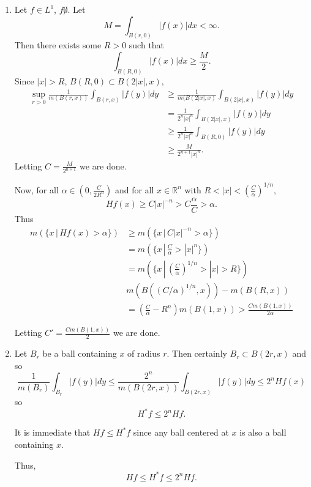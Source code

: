 \documentclass[12pt]{Homework}
\begin{document}
\begin{solution}$\,$
\begin{enumerate}[label=(\alph*)]
    \item Let $f\in L^1$, $f\not0$. Let $$M=\int_{B(r,0)}|f(x)|dx<\infty.$$ Then there exists some $R>0$ such that $$\int_{B(R,0)}|f(x)|dx\ge\frac{M}{2}.$$ Since $|x|>R$, $B(R,0)\subset B(2|x|,x),$ \begin{align*}
        \sup_{r>0}\frac{1}{m(B(r,x))}\int_{B(r,x)}|f(y)|dy&\ge\frac{1}{m(B(2|x|,x)}\int_{B(2|x|,x)}|f(y)|dy\\
        &=\frac{1}{2^n|x|^n}\int_{B(2|x|,x)}|f(y)|dy\\
        &\ge\frac{1}{2^n|x|^n}\int_{B(R,0)}|f(y)|dy\\
        &\ge\frac{M}{2^{n+1}|x|^n}.
    \end{align*}
    Letting $C=\frac{M}{2^{n+1}}$ we are done. 
    
    Now, for all $\alpha\in(0,\frac{C}{2 R^n})$ and for all $x\in\mathbb{R}^n$ with $R<|x|<\left(\frac{C}{\alpha}\right)^{1/n}$, $$Hf(x)\ge C|x|^{-n}>C\frac{\alpha}{C}>\alpha.$$ Thus \begin{align*}
        m(\{x\,|\,Hf(x)>\alpha\})&\ge m(\{x\,|\,C|x|^{-n}>\alpha\})\\
        &=m(\{x\,|\,\frac{C}{\alpha}>|x|^n\})\\
        &=m(\{x\,|\,\left(\frac{C}{\alpha}\right)^{1/n}>|x|>R\})\\
        &m(B((C/\alpha)^{1/n},x))-m(B(R,x))\\
        &=\left(\frac{C}{\alpha}-R^n\right)m(B(1,x))>\frac{Cm(B(1,x))}{2\alpha}
    \end{align*}
    
    Letting $C'=\frac{Cm(B(1,x))}{2}$ we are done.
    \item Let $B_r$ be a ball containing $x$ of radius $r$. Then certainly $B_r\subset B(2r,x)$ and so $$\frac{1}{m(B_r)}\int_{B_r}|f(y)|dy\le\frac{2^n}{m(B(2r,x))}\int_{B(2r,x)}|f(y)|dy\le2^nHf(x)$$ so $$H^*f\le 2^n Hf.$$
    
    It is immediate that $Hf\le H^*f$ since any ball centered at $x$ is also a ball containing $x$.
    
    Thus, $$Hf\le H^*f\le 2^nHf.$$
\end{enumerate}
\end{solution}
\vspace{0.5cm}
\end{document}
